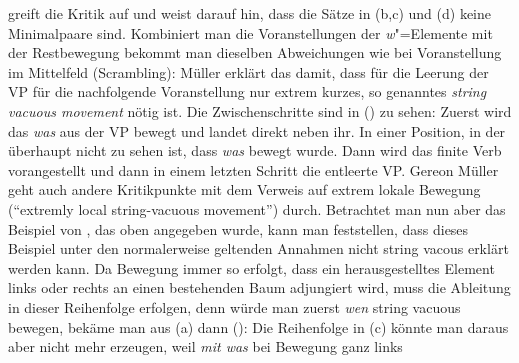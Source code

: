 \citet{GMueller2014a-u} greift die Kritik auf und weist darauf hin, dass die Sätze in (b,c)
und (d) keine Minimalpaare sind. 
\eal
{}
\zl
Kombiniert man die Voranstellungen der \emph{w}"=Elemente mit der Restbewegung bekommt man dieselben
Abweichungen wie bei Voranstellung im Mittelfeld (Scrambling):
\eal
{}
\zl
Müller erklärt das damit, dass für die Leerung der VP für die nachfolgende Voranstellung nur extrem
kurzes, so genanntes \emph{string vacuous movement} nötig ist. Die Zwischenschritte sind in
() zu sehen:
\eal
{}
\zl
Zuerst wird das \emph{was} aus der VP bewegt und landet direkt neben ihr. In einer Position, in der
überhaupt nicht zu sehen ist, dass \emph{was} bewegt wurde. Dann wird das finite Verb vorangestellt
und dann in einem letzten Schritt die entleerte VP. Gereon Müller geht auch andere Kritikpunkte mit
dem Verweis auf extrem lokale Bewegung (``extremly local string-vacuous movement'')
durch. Betrachtet man nun aber das Beispiel von \citet[281]{Haider93a}, das oben angegeben wurde,
kann man feststellen, dass dieses Beispiel unter den normalerweise geltenden Annahmen nicht string vacous erklärt werden kann.
\eal
{}
\zl
Da Bewegung immer so erfolgt, dass ein herausgestelltes Element links oder rechts an einen
bestehenden Baum adjungiert wird, muss die Ableitung in dieser Reihenfolge erfolgen, denn würde man
zuerst \emph{wen} string vacuous bewegen, bekäme man aus (a) dann ():
\z
Die Reihenfolge in (c) könnte man daraus aber nicht mehr erzeugen, weil \emph{mit was} bei Bewegung ganz links
